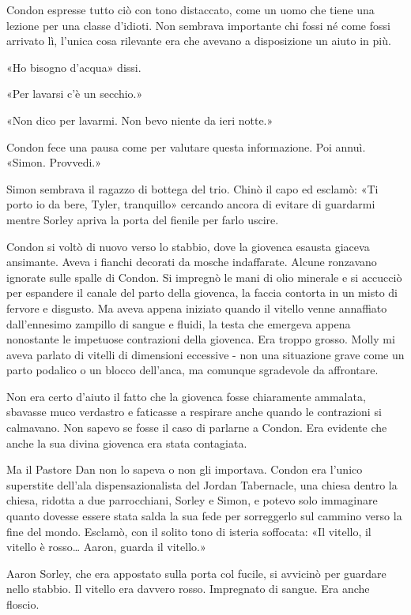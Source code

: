 Condon espresse tutto ciò con tono distaccato, come un uomo che tiene
una lezione per una classe d'idioti. Non sembrava importante chi fossi
né come fossi arrivato lì, l'unica cosa rilevante era che avevano a
disposizione un aiuto in più.

«Ho bisogno d'acqua» dissi.

«Per lavarsi c'è un secchio.»

«Non dico per lavarmi. Non bevo niente da ieri notte.»

Condon fece una pausa come per valutare questa informazione. Poi annuì.
«Simon. Provvedi.»

Simon sembrava il ragazzo di bottega del trio. Chinò il capo ed esclamò:
«Ti porto io da bere, Tyler, tranquillo» cercando ancora di evitare di
guardarmi mentre Sorley apriva la porta del fienile per farlo uscire.

Condon si voltò di nuovo verso lo stabbio, dove la giovenca esausta
giaceva ansimante. Aveva i fianchi decorati da mosche indaffarate.
Alcune ronzavano ignorate sulle spalle di Condon. Si impregnò le mani di
olio minerale e si accucciò per espandere il canale del parto della
giovenca, la faccia contorta in un misto di fervore e disgusto. Ma aveva
appena iniziato quando il vitello venne annaffiato dall'ennesimo
zampillo di sangue e fluidi, la testa che emergeva appena nonostante le
impetuose contrazioni della giovenca. Era troppo grosso. Molly mi aveva
parlato di vitelli di dimensioni eccessive - non una situazione grave
come un parto podalico o un blocco dell'anca, ma comunque sgradevole da
affrontare.

Non era certo d'aiuto il fatto che la giovenca fosse chiaramente
ammalata, sbavasse muco verdastro e faticasse a respirare anche quando
le contrazioni si calmavano. Non sapevo se fosse il caso di parlarne a
Condon. Era evidente che anche la sua divina giovenca era stata
contagiata.

Ma il Pastore Dan non lo sapeva o non gli importava. Condon era l'unico
superstite dell'ala dispensazionalista del Jordan Tabernacle, una chiesa
dentro la chiesa, ridotta a due parrocchiani, Sorley e Simon, e potevo
solo immaginare quanto dovesse essere stata salda la sua fede per
sorreggerlo sul cammino verso la fine del mondo. Esclamò, con il solito
tono di isteria soffocata: «Il vitello, il vitello è rosso\ldots{}
Aaron, guarda il vitello.»

Aaron Sorley, che era appostato sulla porta col fucile, si avvicinò per
guardare nello stabbio. Il vitello era davvero rosso. Impregnato di
sangue. Era anche floscio.

